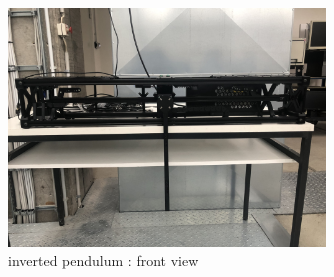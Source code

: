 \begin{figure}[H]
	\centering
	\includegraphics[width=0.75\textwidth]{"src/Images/Real_pendulum1.jpg"}
	\caption{inverted pendulum : front view}
	\label{fig:Real Pendulum}
\end{figure}  


